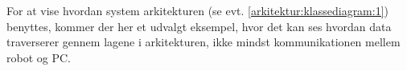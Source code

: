 
For at vise hvordan system arkitekturen (se evt. \cref{arkitektur:klassediagram:1}) benyttes, kommer der her et udvalgt eksempel, hvor det kan ses hvordan data traverserer gennem lagene i arkitekturen, ikke mindst kommunikationen mellem robot og PC.

